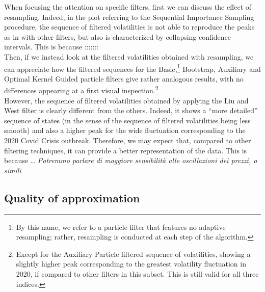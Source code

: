 \documentclass[
]{book}
\theoremstyle{break}
\theoremstyle{nonumberplain}
\begin{document}
When focusing the attention on specific filters, first we can discuss
the effect of resampling. Indeed, in the plot referring to the
Sequential Importance Sampling procedure, the sequence of filtered
volatilities is not able to reproduce the peaks as in with other
filters, but also is characterized by collapsing confidence intervals.
This is because :::::::\\
Then, if we instead look at the filtered volatilities obtained with
resampling, we can appreciate how the filtered sequences for the
Basic,\footnote{By this name, we refer to a particle filter that features no adaptive resampling; rather, resampling is conducted at each step of the algorithm.}
Bootstrap, Auxiliary and Optimal Kernel Guided particle filters give
rather analogous results, with no differences appearing at a first
visual
inspection.\footnote{Except for the Auxiliary Particle filtered sequence of volatilities, showing a slightly higher peak corresponding to the greatest volatility fluctuation in 2020, if compared to other filters in this subset. This is still valid for all three indices.}\\
However, the sequence of filtered volatilities obtained by applying the
Liu and West filter is clearly different from the others. Indeed, it
shows a ``more detailed'' sequence of states (in the sense of the
sequence of filtered volatilities being less smooth) and also a higher
peak for the wide fluctuation corresponding to the 2020 Covid Crisis
outbreak. Therefore, we may expect that, compared to other filtering
techniques, it can provide a better representation of the data. This is
because \ldots{}
\textit{Potremmo parlare di maggiore sensibilità alle oscillazioni dei prezzi, o simili}

\subsection{Quality of approximation}
\end{document}
